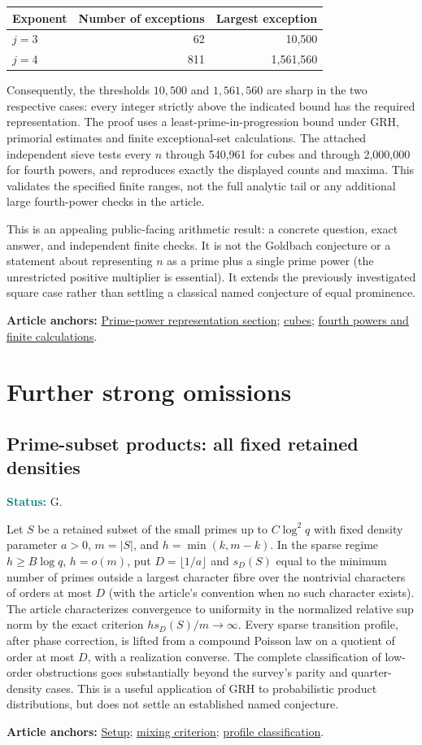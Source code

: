 \documentclass[11pt]{article}
\newcommand{\art}[3]{\href{https://github.com/VladimirReshetnikov/ProveIt/blob/3c4d27a69c98d09319a51e41a19fca05bb80a3e2/Analysis/GeneralizedRiemannHypothesis/Article/sections/#1.tex\#L#2}{#3}}
\newcommand{\status}[1]{\par\smallskip\noindent\textcolor{teal}{\textbf{Status:}} #1\par\smallskip}
\newcommand{\sources}[1]{\par\smallskip\noindent\textbf{Article anchors:} #1\par}
\begin{document}
\begin{center}
\begin{tabular}{@{}lrr@{}}\toprule
Exponent & Number of exceptions & Largest exception\\\midrule
$j=3$ &62&10,500\\
$j=4$ &811&1,561,560\\\bottomrule\end{tabular}
\end{center}
Consequently, the thresholds $10,500$ and $1,561,560$ are sharp in the two respective cases: every integer strictly above the indicated bound has the required representation. The proof uses a least-prime-in-progression bound under GRH, primorial estimates and finite exceptional-set calculations. The attached independent sieve tests every $n$ through 540,961 for cubes and through 2,000,000 for fourth powers, and reproduces exactly the displayed counts and maxima. This validates the specified finite ranges, not the full analytic tail or any additional large fourth-power checks in the article.

This is an appealing public-facing arithmetic result: a concrete question, exact answer, and independent finite checks. It is not the Goldbach conjecture or a statement about representing $n$ as a prime plus a single prime power (the unrestricted positive multiplier is essential). It extends the previously investigated square case rather than settling a classical named conjecture of equal prominence.
\sources{\art{dir}{567}{Prime-power representation section}; \art{dir}{576}{cubes}; \art{dir}{625}{fourth powers and finite calculations}.}

\section{Further strong omissions}
\subsection{Prime-subset products: all fixed retained densities}
\status{G.}
Let $S$ be a retained subset of the small primes up to $C\log^2 q$ with fixed density parameter $a>0$, $m=|S|$, and $h=\min(k,m-k)$. In the sparse regime $h\ge B\log q$, $h=o(m)$, put $D=\lfloor1/a\rfloor$ and $s_D(S)$ equal to the minimum number of primes outside a largest character fibre over the nontrivial characters of orders at most $D$ (with the article's convention when no such character exists). The article characterizes convergence to uniformity in the normalized relative sup norm by the exact criterion $hs_D(S)/m\to\infty$. Every sparse transition profile, after phase correction, is lifted from a compound Poisson law on a quotient of order at most $D$, with a realization converse. The complete classification of low-order obstructions goes substantially beyond the survey's parity and quarter-density cases. This is a useful application of GRH to probabilistic product distributions, but does not settle an established named conjecture.
\sources{\art{dir}{4665}{Setup}; \art{dir}{4870}{mixing criterion}; \art{dir}{4912}{profile classification}.}
\clearpage
\end{document}
